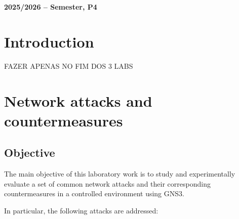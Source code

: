 \documentclass[12pt]{article}
\begin{document}
\begin{center}
    \large \bf 2025/2026 --  Semester, P4
\end{center}

\thispagestyle{empty}

\setcounter{page}{0}

\newpage

\tableofcontents 

\newpage


\section{Introduction}

FAZER APENAS NO FIM DOS 3 LABS

\newpage

\section {Network attacks and countermeasures}

\subsection{Objective}

The main objective of this laboratory work is to study and experimentally evaluate a set of common network attacks and their corresponding countermeasures in a controlled environment using GNS3.

In particular, the following attacks are addressed:
\end{document}
